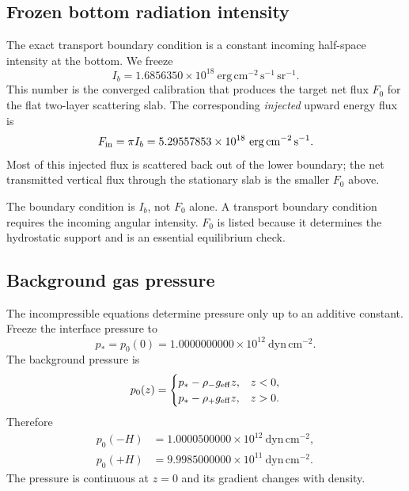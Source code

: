 \documentclass[11pt]{article}
\begin{document}
\subsection{Frozen bottom radiation intensity}
The exact transport boundary condition is a constant incoming half-space intensity at the bottom. We freeze
\begin{equation}
\boxed{I_b=1.6856350\times10^{18}\ \mathrm{erg\,cm^{-2}\,s^{-1}\,sr^{-1}}.}
\end{equation}
This number is the converged calibration that produces the target net flux $F_0$ for the flat two-layer scattering slab. The corresponding \emph{injected} upward energy flux is
\begin{equation}
F_{\rm in}=\pi I_b=5.29557853\times10^{18}\ \mathrm{erg\,cm^{-2}\,s^{-1}}.
\end{equation}
Most of this injected flux is scattered back out of the lower boundary; the net transmitted vertical flux through the stationary slab is the smaller $F_0$ above.

\begin{warningbox}
The boundary condition is $I_b$, not $F_0$ alone. A transport boundary condition requires the incoming angular intensity. $F_0$ is listed because it determines the hydrostatic support and is an essential equilibrium check.
\end{warningbox}

\subsection{Background gas pressure}
The incompressible equations determine pressure only up to an additive constant. Freeze the interface pressure to
\begin{equation}
\boxed{p_*=p_0(0)=1.0000000000\times10^{12}\ \mathrm{dyn\,cm^{-2}}.}
\end{equation}
The background pressure is
\begin{equation}
p_0(z)=
\begin{cases}
p_*-\rho_-g_{\rm eff}z,&z<0,\\
p_*-\rho_+g_{\rm eff}z,&z>0.
\end{cases}
\end{equation}
Therefore
\begin{align}
p_0(-H)&=1.0000500000\times10^{12}\ \mathrm{dyn\,cm^{-2}},\\
p_0(+H)&=9.9985000000\times10^{11}\ \mathrm{dyn\,cm^{-2}}.
\end{align}
The pressure is continuous at $z=0$ and its gradient changes with density.
\end{document}
